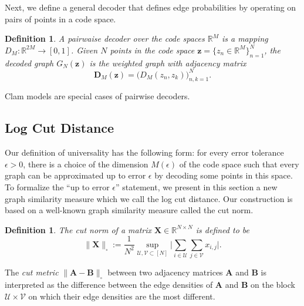 \documentclass[letterpaper]{article} %
\newtheorem{definition}[theorem]{Definition}
\begin{document}
Next, we define a general decoder that defines edge probabilities  by operating on pairs of points in a code space. 

\begin{definition}
   A \emph{pairwaise decoder} over the code spaces $\mathbb{R}^M$ is a mapping $D_M:\mathbb{R}^{2M}\rightarrow[0,1]$. Given $N$ points in the code space $\mathbf{z}=\{z_n\in\mathbb{R}^M\}_{n=1}^N$, the decoded graph $G_N(\mathbf{z})$ is the weighted graph with adjacency matrix  
\[\mathbf{D}_M(\mathbf{z})=\big(D_M(z_n,z_k)\big)_{n,k=1}^N.\]
\end{definition}

Clam models are special cases of pairwise decoders.


\subsection{Log Cut Distance}

Our definition of universality has the following form: for every error tolerance $\epsilon>0$, there is a choice of the dimension $M(\epsilon)$ of the code space such that every graph can be approximated up to error $\epsilon$ by decoding some points in this space. To formalize the ``up to error $\epsilon$'' statement, we present in this section a new graph similarity measure which we call the log cut distance.
Our construction is based on a well-known graph similarity measure called the cut norm.

\begin{definition}
  The \emph{cut norm} of a matrix $\mathbf{X}\in\mathbb{R}^{N\times N}$ is defined to be
    \begin{equation}
    \label{eq:GraphCutNorm0}  \|\mathbf{X}\|_{\square}:=\frac{1}{N^2}\sup_{\mathcal{U},\mathcal{V}\subset[N]}\Big|\sum_{i\in \mathcal{U}}\sum_{j\in \mathcal{V}}x_{i,j}\Big|.
\end{equation}  
\end{definition}
The \emph{cut metric} $\|\mathbf{A}-\mathbf{B} \|_{\square}$ between two adjacency matrices $\mathbf{A}$ and $\mathbf{B}$ is interpreted as the difference between the edge densities of $\mathbf{A}$ and $\mathbf{B}$ on the block $\mathcal{U}\times\mathcal{V}$ on which their edge densities are the most different.
\end{document}
